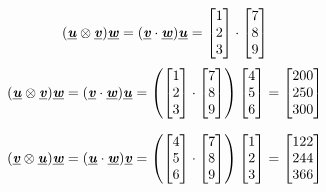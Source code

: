 \documentclass[12pt]{article}
\begin{document}
\[
    (\underline{\textbf{\textit{u}} } \otimes \underline{\textbf{\textit{v}} } )\underline{\textbf{\textit{w}} } = (\underline{\textbf{\textit{v}} } \cdot \underline{\textbf{\textit{w}} } )\underline{\textbf{\textit{u}} } = \begin{bmatrix}
        1 \\
        2 \\
        3 \\
   \end{bmatrix}\cdot\begin{bmatrix}
    7 \\
    8 \\
    9 \\
\end{bmatrix} 
\]
$$
(\underline{\textbf{\textit{u}} } \otimes \underline{\textbf{\textit{v}} } )\underline{\textbf{\textit{w}} } = (\underline{\textbf{\textit{v}} } \cdot \underline{\textbf{\textit{w}} } )\underline{\textbf{\textit{u}} } = \left(\begin{bmatrix}
1 \\
2 \\
3
\end{bmatrix}\cdot \begin{bmatrix}
7 \\
8 \\
9
\end{bmatrix}\right)\begin{bmatrix}
4 \\
5 \\
6
\end{bmatrix}=\begin{bmatrix}
200 \\
250 \\
300
\end{bmatrix}
$$

\[
    (\underline{\textbf{\textit{v}} }\otimes \underline{\textbf{\textit{u}} })\underline{\textbf{\textit{w}} }=(\underline{\textbf{\textit{u}} }\cdot \underline{\textbf{\textit{w}} })\underline{\textbf{\textit{v}} }=\left(\begin{bmatrix}
        4 \\
        5 \\
        6
        \end{bmatrix}\cdot \begin{bmatrix}
        7 \\
        8 \\
        9
        \end{bmatrix}\right)\begin{bmatrix}
        1 \\
        2 \\
        3
        \end{bmatrix}=\begin{bmatrix}
        122 \\
        244 \\
        366
        \end{bmatrix}
\]
\end{document}
